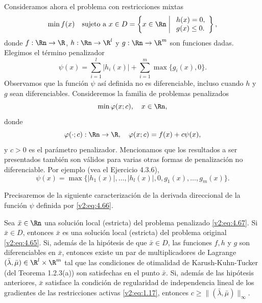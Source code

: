 Consideramos ahora el problema con restricciones mixtas
\begin{equation}
    \min f(x) \quad \text{sujeto a } x \in D = \left\{ x \in \Rn \mathrel{\bigg|} \begin{array}{l} h(x) = 0, \\ g(x) \le 0. \end{array} \right\},
    \label{v2:eq:4.65}
\end{equation}
donde $f : \Rn \to \R$, $h : \Rn \to \R^l$ y $g : \Rn \to \R^m$ son funciones dadas. Elegimos el término penalizador
\begin{equation}
    \psi(x) = \sum_{i=1}^l |h_i(x)| + \sum_{i=1}^m \max\{g_i(x), 0\}.
    \label{v2:eq:4.66}
\end{equation}
Observamos que la función $\psi$ así definida no es diferenciable, incluso cuando $h$ y $g$ sean diferenciables. Consideremos la familia de problemas penalizados
\begin{equation}
    \min \varphi(x; c), \quad x \in \Rn,
    \label{v2:eq:4.67}
\end{equation}
donde
\begin{equation}
    \varphi(\cdot; c) : \Rn \to \R, \quad \varphi(x; c) = f(x) + c\psi(x),
    \label{v2:eq:4.68}
\end{equation}
y $c > 0$ es el parámetro penalizador.
Mencionamos que los resultados a ser presentados también son válidos para varias otras formas de penalización no diferenciable. Por ejemplo (vea el Ejercicio 4.3.6),
\begin{equation}
    \psi(x) = \max \{|h_1(x)|, \dots, |h_l(x)|, 0, g_1(x), \dots, g_m(x)\}.
    \label{v2:eq:4.69}
\end{equation}

Precisaremos de la siguiente caracterización de la derivada direccional de la función $\psi$ definida por \eqref{v2:eq:4.66}.

\begin{theorem}\label{v2:thm:4.3.4}
    Sea $\bar{x} \in \Rn$ una solución local (estricta) del problema penalizado \eqref{v2:eq:4.67}.
    Si $\bar{x} \in D$, entonces $\bar{x}$ es una solución local (estricta) del problema original \eqref{v2:eq:4.65}.
    Si, además de la hipótesis de que $\bar{x} \in D$, las funciones $f, h$ y $g$ son diferenciables en $\bar{x}$, entonces existe un par de multiplicadores de Lagrange $(\bar{\lambda}, \bar{\mu}) \in \R^l \times \R^m$ tal que las condiciones de otimalidad de Karush-Kuhn-Tucker (del Teorema 1.2.3(a)) son satisfechas en el punto $\bar{x}$.
    Si, además de las hipótesis anteriores, $\bar{x}$ satisface la condición de regularidad de independencia lineal de los gradientes de las restricciones activas \eqref{v2:eq:1.17}, entonces $c \ge \|(\bar{\lambda}, \bar{\mu})\|_\infty$.
\end{theorem}

